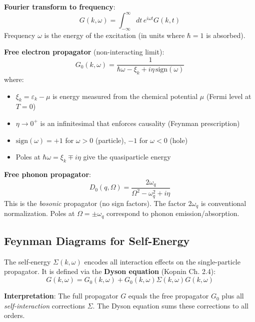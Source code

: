 \documentclass[12pt]{article}
\begin{document}
\textbf{Fourier transform to frequency}:
\begin{equation}
G(k,\omega) = \int_{-\infty}^{\infty} dt \, e^{i\omega t} G(k,t)
\end{equation}
Frequency $\omega$ is the energy of the excitation (in units where $\hbar = 1$ is absorbed).

\textbf{Free electron propagator} (non-interacting limit):
\begin{equation}
G_0(k,\omega) = \frac{1}{\hbar\omega - \xi_k + i\eta \,\text{sign}(\omega)}
\end{equation}
where:
\begin{itemize}
\item $\xi_k = \varepsilon_k - \mu$ is energy measured from the chemical potential $\mu$ (Fermi level at $T=0$)
\item $\eta \to 0^+$ is an infinitesimal that enforces causality (Feynman prescription)
\item $\text{sign}(\omega) = +1$ for $\omega > 0$ (particle), $-1$ for $\omega < 0$ (hole)
\item Poles at $\hbar\omega = \xi_k \mp i\eta$ give the quasiparticle energy
\end{itemize}

\textbf{Free phonon propagator}:
\begin{equation}
D_0(q,\Omega) = \frac{2\omega_q}{\Omega^2 - \omega_q^2 + i\eta}
\end{equation}
This is the \textit{bosonic} propagator (no sign factors). The factor $2\omega_q$ is conventional normalization. Poles at $\Omega = \pm\omega_q$ correspond to phonon emission/absorption.

\subsection{Feynman Diagrams for Self-Energy}

The self-energy $\Sigma(k,\omega)$ encodes all interaction effects on the single-particle propagator. It is defined via the \textbf{Dyson equation} (Kopnin Ch. 2.4):
\begin{equation}
\boxed{
G(k,\omega) = G_0(k,\omega) + G_0(k,\omega) \Sigma(k,\omega) G(k,\omega)
}
\end{equation}

\textbf{Interpretation}: The full propagator $G$ equals the free propagator $G_0$ plus all \textit{self-interaction} corrections $\Sigma$. The Dyson equation sums these corrections to all orders.
\end{document}
